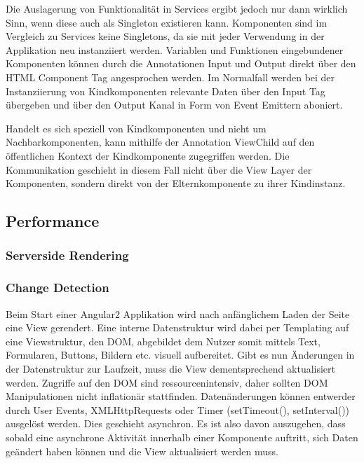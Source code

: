 Die Auslagerung von Funktionalität in Services ergibt jedoch nur dann wirklich Sinn,
wenn diese auch als Singleton existieren kann. Komponenten sind im Vergleich zu Services keine Singletons,
da sie mit jeder Verwendung in der Applikation neu instanziiert werden.
Variablen und Funktionen eingebundener Komponenten können durch die Annotationen Input und Output
direkt über den HTML Component Tag angesprochen werden. Im Normalfall werden bei der Instanziierung von Kindkomponenten
relevante Daten über den Input Tag übergeben und über den Output Kanal in Form von Event Emittern aboniert. \cite{Angul94:online}

Handelt es sich speziell von Kindkomponenten und nicht um Nachbarkomponenten,
kann mithilfe der Annotation ViewChild auf den öffentlichen Kontext der Kindkomponente zugegriffen werden.
Die Kommunikation geschieht in diesem Fall nicht über die View Layer der Komponenten,
sondern direkt von der Elternkomponente zu ihrer Kindinstanz. \cite{ViewC61:online}

\subsection{Performance}

\subsubsection{Serverside Rendering}

\subsubsection{Change Detection}

Beim Start einer Angular2 Applikation wird nach anfänglichem Laden der Seite eine View gerendert.
Eine interne Datenstruktur wird dabei per Templating auf eine Viewstruktur, den DOM, abgebildet dem Nutzer somit mittels Text,
Formularen, Buttons, Bildern etc. visuell aufbereitet.
Gibt es nun Änderungen in der Datenstruktur zur Laufzeit, muss die View dementsprechend aktualisiert werden.
Zugriffe auf den DOM sind ressourcenintensiv, daher sollten DOM Manipulationen nicht inflationär stattfinden.
Datenänderungen können entwerder durch User Events, XMLHttpRequests oder Timer (setTimeout(), setInterval()) ausgelöst werden.
Dies geschieht asynchron. Es ist also davon auszugehen, dass sobald eine asynchrone Aktivität innerhalb einer Komponente auftritt,
sich Daten geändert haben können und die View aktualisiert werden muss.
\cite{changedetection-explained}

